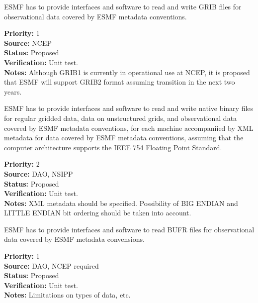ESMF has to provide interfaces and software to read and write GRIB
files for observational data covered by ESMF metadata conventions.

\begin{reqlist}
{\bf Priority:} 1 \\
{\bf Source:} NCEP \\
{\bf Status:} Proposed \\
{\bf Verification:} Unit test. \\
{\bf Notes:} Although GRIB1 is currently in operational use at NCEP,
it is proposed that ESMF will support GRIB2 format assuming transition
in the next two years.
\end{reqlist}





ESMF has to provide interfaces and software to read and write native
binary files for regular gridded data, data on unstructured grids, and 
observational data  covered by ESMF metadata conventions, for each machine 
accompaniied by XML metadata for data covered by ESMF metadata conventions,
assuming that the computer architecture supports the IEEE 754 Floating
Point Standard. 

\begin{reqlist}
{\bf Priority:} 2 \\
{\bf Source:} DAO, NSIPP \\
{\bf Status:} Proposed \\
{\bf Verification:} Unit test. \\
{\bf Notes:} XML metadata should be specified. Possibility of BIG
ENDIAN and LITTLE ENDIAN bit ordering should be taken into account.
\end{reqlist}



ESMF has to provide interfaces and software to read BUFR files for
observational data covered by ESMF metadata convensions.

\begin{reqlist}
{\bf Priority:} 1 \\
{\bf Source:} DAO, NCEP required \\
{\bf Status:} Proposed \\
{\bf Verification:} Unit test. \\
{\bf Notes:} Limitations on types of data, etc.
\end{reqlist}




